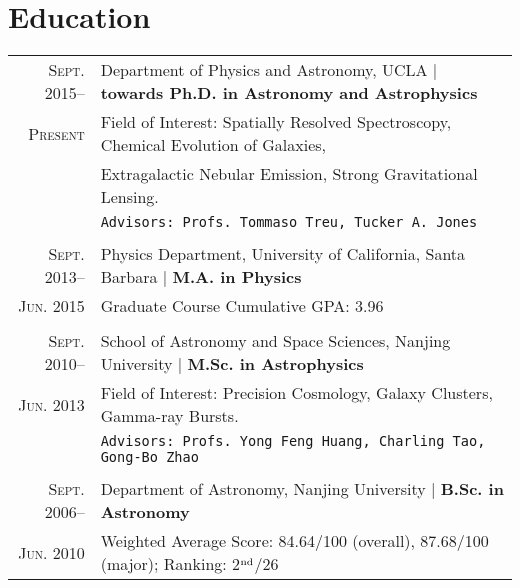 \documentclass[letterpaper,11pt]{article}
\newcommand{\narrow}{-1.8ex}
\begin{document}
\section{Education}
\begin{tabular}{r|p{6.5in}}
  \textsc{Sept. 2015}--     & Department of Physics and Astronomy, UCLA    |   \textbf{towards Ph.D. in Astronomy and Astrophysics}   \\
  \textsc{Present}          & Field of Interest: Spatially Resolved Spectroscopy, Chemical Evolution of Galaxies, \\
                            & \hspace*{7.3em} Extragalactic Nebular Emission, Strong Gravitational Lensing. \\
                            & \texttt{Advisors: Profs. Tommaso Treu, Tucker A. Jones}     \\
  \multicolumn{2}{c}{} \\[\narrow]
  \textsc{Sept. 2013}--     & Physics Department, University of California, Santa Barbara    |   \textbf{M.A. in Physics}   \\
  \textsc{Jun. 2015}       & Graduate Course Cumulative GPA: 3.96     \\
  \multicolumn{2}{c}{} \\[\narrow]
  \textsc{Sept. 2010}--     & School of Astronomy and Space Sciences, Nanjing University  |  \textbf{M.Sc. in Astrophysics}   \\
  \textsc{Jun. 2013}         & Field of Interest: Precision Cosmology, Galaxy Clusters, Gamma-ray Bursts. \\
                            & \texttt{Advisors: Profs. Yong Feng Huang, Charling Tao, Gong-Bo Zhao}   \\
  \multicolumn{2}{c}{} \\[\narrow]
  \textsc{Sept. 2006}--     &   Department of Astronomy, Nanjing University  |  \textbf{B.Sc. in Astronomy}    \\
  \textsc{Jun. 2010}        &   Weighted Average Score: 84.64/100 (overall), 87.68/100 (major); Ranking: 2$^{\rm nd}$/26
\end{tabular}
\end{document}
